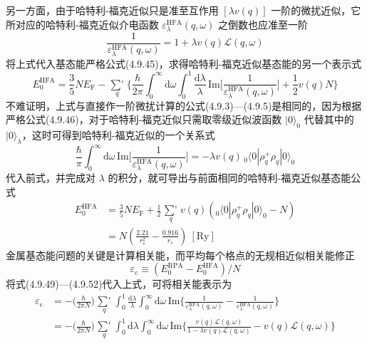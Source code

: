 另一方面，由于哈特利-福克近似只是准至互作用 $\left[\lambda v(q)\right]$ 一阶的微扰近似，它所对应的哈特利-福克近似介电函数 $\varepsilon_{\lambda}^{\mathrm{HFA}}(q,\omega)$ 之倒数也应准至一阶
\begin{equation}
  \frac{1}{\varepsilon_{\lambda}^{\mathrm{HFA}}(q,\omega)}
  =1+\lambda v(q)\mathcal{L}(q,\omega)
\end{equation}
将上式代入基态能严格公式(4.9.45)，求得哈特利-福克近似基态能的另一个表示式
\begin{equation}
  E_{0}^{\mathrm{HFA}}=\frac{3}{5}NE_{\mathrm{F}}-\mathop{{\sum}'}\limits_{q}
  \bigg\{\frac{\hbar}{2\pi}\int_{0}^{\infty}\mathrm{d}\omega
  \int_{0}^{1}\frac{\mathrm{d}\lambda}{\lambda}\,
  \mathrm{Im}\bigg[\frac{1}{\varepsilon_{\lambda}^{\mathrm{HFA}}(q,\omega)}\bigg]
  +\frac{1}{2}v(q)N\bigg\}
\end{equation}
不难证明，上式与直接作一阶微扰计算的公式(4.9.3)—(4.9.5)是相同的，因为根据严格公式(4.9.46)，对于哈特利-福克近似只需取零级近似波函数 $|0\rangle_{0}$ 代替其中的 $|0\rangle_{\lambda}$，这时可得到哈特利-福克近似的一个关系式
\begin{equation}
  \frac{\hbar}{\pi}\int_{0}^{\infty}\mathrm{d}\omega\,
  \mathrm{Im}\bigg[\frac{1}{\varepsilon_{\lambda}^{\mathrm{HFA}}(q,\omega)}\bigg]
  =-\lambda v(q)\,{}_{0}\langle 0|\rho_{q}^{+}\rho_{q}|0\rangle_{0}
\end{equation}
代入前式，并完成对 $\lambda$ 的积分，就可导出与前面相同的哈特利-福克近似基态能公式
\begin{equation}
\begin{aligned}
  E_{0}^{\mathrm{HFA}}
  &=\frac{3}{5}NE_{\mathrm{F}}+\frac{1}{2}\mathop{{\sum}'}\limits_{q}v(q)
  \left({}_{0}\langle 0|\rho_{q}^{+}\rho_{q}|0\rangle_{0}-N\right)\\
  &=N\left(\frac{2.21}{r_{s}^{2}}-\frac{0.916}{r_{s}}\right)\ [\mathrm{Ry}]
\end{aligned}
\end{equation}
金属基态能问题的关键是计算相关能，而平均每个格点的无规相近似相关能修正
\begin{equation}
  \varepsilon_{\mathrm{c}}\equiv
  \left(E_{0}^{\mathrm{RPA}}-E_{0}^{\mathrm{HFA}}\right)/N
\end{equation}
将式(4.9.49)—(4.9.52)代入上式，可将相关能表示为
\begin{equation}
\begin{aligned}
  \varepsilon_{\mathrm{c}}
  &=-\bigg(\frac{\hbar}{2\pi N}\bigg)\mathop{{\sum}'}\limits_{q}
  \int_{0}^{1}\frac{\mathrm{d}\lambda}{\lambda}\int_{0}^{\infty}\mathrm{d}\omega\,
  \mathrm{Im}\bigg\{\frac{1}{\varepsilon_{\lambda}^{\mathrm{RPA}}(q,\omega)}
  -\frac{1}{\varepsilon_{\lambda}^{\mathrm{HFA}}(q,\omega)}\bigg\}\\
  &=-\bigg(\frac{\hbar}{2\pi N}\bigg)\mathop{{\sum}'}\limits_{q}
  \int_{0}^{1}\mathrm{d}\lambda\int_{0}^{\infty}\mathrm{d}\omega\,
  \mathrm{Im}\bigg\{\frac{v(q)\mathcal{L}(q,\omega)}
  {1-\lambda v(q)\mathcal{L}(q,\omega)}
  -v(q)\mathcal{L}(q,\omega)\bigg\}
\end{aligned}
\end{equation}
